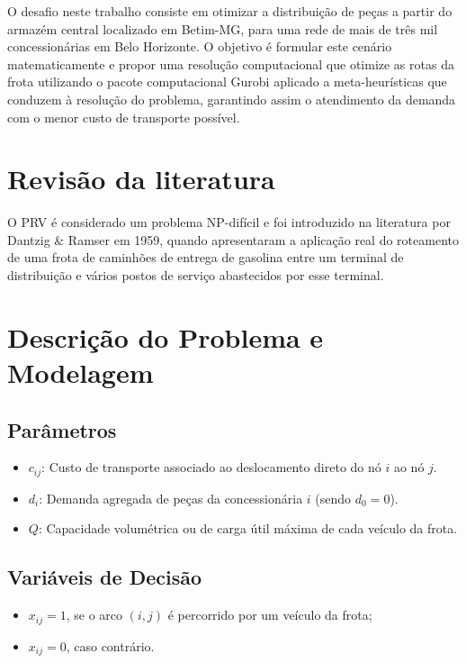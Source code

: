 \documentclass[conference]{IEEEtran}
\begin{document}
O desafio neste trabalho consiste em otimizar a distribuição de peças a partir do armazém central 
localizado em Betim-MG, para uma rede de mais de três mil concessionárias em Belo Horizonte. O objetivo é formular este
cenário matematicamente e propor uma resolução computacional que otimize as rotas da frota utilizando o pacote computacional Gurobi aplicado a meta-heurísticas que conduzem à resolução do problema, 
garantindo assim o atendimento da demanda com o menor custo de transporte possível.


\section{Revisão da literatura}


O PRV é considerado um problema NP-difícil e foi introduzido na literatura por Dantzig \& Ramser em 1959,
quando apresentaram a aplicação real do roteamento de uma frota de caminhões de entrega de gasolina entre um terminal de distribuição e vários 
postos de serviço abastecidos por esse terminal\cite{kumar2015}.


\section{Descrição do Problema e Modelagem}

\subsection{Parâmetros}
\begin{itemize}
    \item $c_{ij}$: Custo de transporte associado ao deslocamento direto do nó $i$ ao nó $j$.
    \item $d_i$: Demanda agregada de peças da concessionária $i$ (sendo $d_0 = 0$).
    \item $Q$: Capacidade volumétrica ou de carga útil máxima de cada veículo da frota.
\end{itemize}
\subsection{Variáveis de Decisão}
\begin{itemize}
    \item $x_{ij} = 1$, se o arco $(i,j)$ é percorrido por um veículo da frota;
    \item $x_{ij} = 0$, caso contrário.
\end{itemize}
\end{document}
